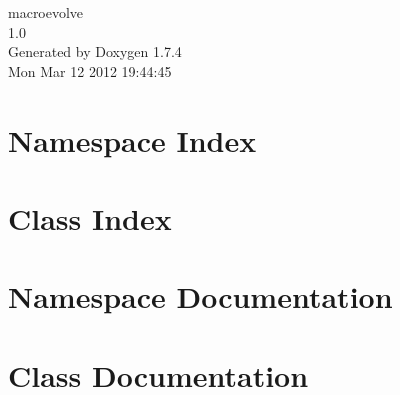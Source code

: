\documentclass[a4paper]{book}
\begin{document}
\hypersetup{pageanchor=false}
\begin{titlepage}
\vspace*{7cm}
\begin{center}
{\Large macroevolve \\[1ex]\large 1.0 }\\
\vspace*{1cm}
{\large Generated by Doxygen 1.7.4}\\
\vspace*{0.5cm}
{\small Mon Mar 12 2012 19:44:45}\\
\end{center}
\end{titlepage}
\clearemptydoublepage
{}
\tableofcontents
\clearemptydoublepage
{}
\hypersetup{pageanchor=true}
\chapter{Namespace Index}

\chapter{Class Index}

\chapter{Namespace Documentation}









\chapter{Class Documentation}





















\printindex
\end{document}
